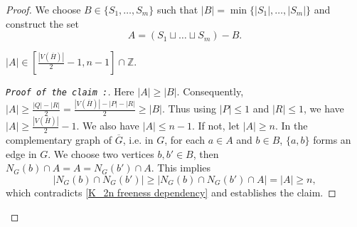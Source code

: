 \documentclass[reqno,10pt]{amsart}
\theoremstyle{definition}
\begin{document}
\begin{proof}
We choose $B\in\{S_{1},\ldots,S_{m}\}$ such that $|B|=\min\{|S_{1}|,\ldots,|S_{m}|\}$ and construct the set 
\begin{equation*}
 A=(S_{1}\sqcup\ldots\sqcup S_{m})-B.   
\end{equation*}

  $|A|\in\left[\frac{|V(\overline{H})|}{2}-1,n-1\right]\cap\mathbb{Z}$.
\begin{proof}[\tt{Proof of the claim} :]\renewcommand{\qedsymbol}{}
Here $|A|\geq|B|$. Consequently, $|A|\geq\frac{|Q|-|R|}{2}=\frac{|V(\overline{H})|-|P|-|R|}{2}\geq|B|$. Thus using $|P|\leq1$ and $|R|\leq1$, we have $|A|\geq\frac{|V(\overline{H})|}{2}-1$. We also have $|A|\leq n-1$. If not, let $|A|\geq n$. In the complementary graph of $\overline{G}$, i.e. in $G$, for each $a\in A$ and $b\in B$, $\{a,b\}$ forms an edge in $G$. We choose two vertices $b,b'\in B$, then $N_{G}(b)\cap A=A=N_{G}(b')\cap A$. This implies 
\begin{equation*}
 |N_{G}(b)\cap N_{G}(b')|\geq|N_{G}(b)\cap N_{G}(b')\cap A|=|A|\geq n,   
\end{equation*}
which contradicts \eqref{K_2n freeness dependency} and establishes the claim. 
\end{proof}


\end{proof}
\end{document}
